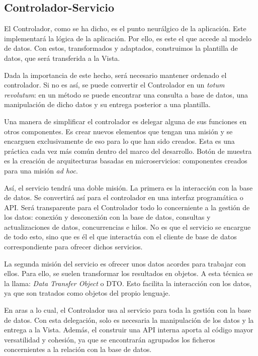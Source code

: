 \subsection{Controlador-Servicio}
El Controlador, como se ha dicho, es el punto neurálgico de la aplicación. Este implementará la lógica de la aplicación. Por ello, es este el que accede al modelo de datos. Con estos, transformados y adaptados, construimos la plantilla de datos, que será transferida a la Vista.

Dada la importancia de este hecho, será necesario mantener ordenado el controlador. Si no es así, se puede convertir el Controlador en un \textit{totum revolutum}: en un método se puede encontrar una consulta a base de datos, una manipulación de dicho datos y su entrega posterior a una plantilla.

Una manera de simplificar el controlador es delegar alguna de sus funciones en otros componentes. Es crear nuevos elementos que tengan una misión y se encarguen exclusivamente de eso para lo que han sido creados. Esta es una práctica cada vez más común dentro del marco del desarrollo. Botón de muestra es la creación de arquitecturas basadas en microservicios: componentes creados para una misión \textit{ad hoc}.

Así, el servicio tendrá una doble misión. La primera es la interacción con la base de datos. Se convertirá así para el controlador en una interfaz programática o API. Será transparente para el Controlador todo lo concerniente a la gestión de los datos: conexión y desconexión con la base de datos, consultas y actualizaciones de datos, concurrencias e hilos. No es que el servicio se encargue de todo esto, sino que es él el que interactúa con el cliente de base de datos correspondiente para ofrecer dichos servicios.

La segunda misión del servicio es ofrecer unos datos acordes para trabajar con ellos. Para ello, se suelen transformar los resultados en objetos. A esta técnica se la llama: \textit{Data Transfer Object} o DTO. Esto facilita la interacción con los datos, ya que son tratados como objetos del propio lenguaje.

En aras a lo cual, el Controlador usa al servicio para toda la gestión con la base de datos. Con esta delegación, solo es necesaria la manipulación de los datos y la entrega a la Vista. Además, el construir una API interna aporta al código mayor versatilidad y cohesión, ya que se encontrarán agrupados los ficheros concernientes a la relación con la base de datos.

